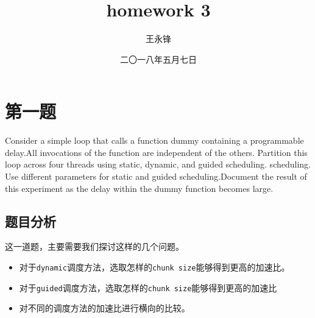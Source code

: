 \documentclass[forprint]{myreport}
\begin{document}
\title{homework 3}
\author{王永锋}                            %
\date{二〇一八年五月七日}                %
\maketitle
\frontmatter
\tableofcontents
\mainmatter 

\chapter{第一题}

\begin{tcolorbox}[title = {第一题}]
Consider a simple loop that calls a function dummy containing a programmable delay.All invocations of the function are independent of the others. Partition this loop across four threads using static, dynamic, and guided scheduling. scheduling. Use different parameters for static and guided scheduling.Document the result of this experiment as the delay within the dummy function becomes large.
\end{tcolorbox}

\section{题目分析}

这一道题，主要需要我们探讨这样的几个问题。

\begin{itemize}
    \item 对于\texttt{dynamic}调度方法，选取怎样的\texttt{chunk size}能够得到更高的加速比。
    \item 对于\texttt{guided}调度方法，选取怎样的\texttt{chunk size}能够得到更高的加速比
    \item 对不同的调度方法的加速比进行横向的比较。
\end{itemize}
\end{document}
